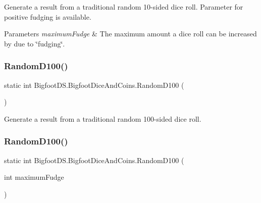 Generate a result from a traditional random 10-\/sided dice roll. Parameter for positive fudging is available. 


\begin{DoxyParams}{Parameters}
{\em maximum\+Fudge} & The maximum amount a dice roll can be increased by due to \char`\"{}fudging\char`\"{}.\\
\hline
\end{DoxyParams}
\mbox{\label{class_bigfoot_d_s_1_1_bigfoot_dice_and_coins_af70fd36e549d8b24cb9f6a0bf65420c4}} 
\subsubsection{\texorpdfstring{Random\+D100()}{RandomD100()}\hspace{0.1cm}{\footnotesize\ttfamily [1/2]}}
{\footnotesize\ttfamily static int Bigfoot\+D\+S.\+Bigfoot\+Dice\+And\+Coins.\+Random\+D100 (\begin{DoxyParamCaption}{ }\end{DoxyParamCaption})\hspace{0.3cm}{\ttfamily [static]}}



Generate a result from a traditional random 100-\/sided dice roll. 

\mbox{\label{class_bigfoot_d_s_1_1_bigfoot_dice_and_coins_a1adc13a0780aa138b796f4674d2e4eda}} 
\subsubsection{\texorpdfstring{Random\+D100()}{RandomD100()}\hspace{0.1cm}{\footnotesize\ttfamily [2/2]}}
{\footnotesize\ttfamily static int Bigfoot\+D\+S.\+Bigfoot\+Dice\+And\+Coins.\+Random\+D100 (\begin{DoxyParamCaption}\item[{int}]{maximum\+Fudge }\end{DoxyParamCaption})\hspace{0.3cm}{\ttfamily [static]}}



